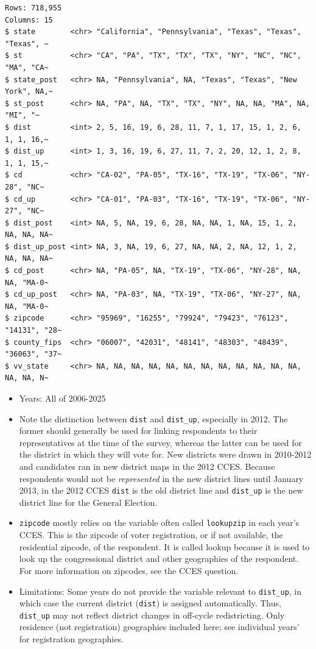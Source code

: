 \documentclass[10pt,article,oneside]{memoir}
\begin{document}
\begin{verbatim}
Rows: 718,955
Columns: 15
$ state        <chr> "California", "Pennsylvania", "Texas", "Texas", "Texas", ~
$ st           <chr> "CA", "PA", "TX", "TX", "TX", "NY", "NC", "NC", "MA", "CA~
$ state_post   <chr> NA, "Pennsylvania", NA, "Texas", "Texas", "New York", NA,~
$ st_post      <chr> NA, "PA", NA, "TX", "TX", "NY", NA, NA, "MA", NA, "MI", "~
$ dist         <int> 2, 5, 16, 19, 6, 28, 11, 7, 1, 17, 15, 1, 2, 6, 1, 1, 16,~
$ dist_up      <int> 1, 3, 16, 19, 6, 27, 11, 7, 2, 20, 12, 1, 2, 8, 1, 1, 15,~
$ cd           <chr> "CA-02", "PA-05", "TX-16", "TX-19", "TX-06", "NY-28", "NC~
$ cd_up        <chr> "CA-01", "PA-03", "TX-16", "TX-19", "TX-06", "NY-27", "NC~
$ dist_post    <int> NA, 5, NA, 19, 6, 28, NA, NA, 1, NA, 15, 1, 2, NA, NA, NA~
$ dist_up_post <int> NA, 3, NA, 19, 6, 27, NA, NA, 2, NA, 12, 1, 2, NA, NA, NA~
$ cd_post      <chr> NA, "PA-05", NA, "TX-19", "TX-06", "NY-28", NA, NA, "MA-0~
$ cd_up_post   <chr> NA, "PA-03", NA, "TX-19", "TX-06", "NY-27", NA, NA, "MA-0~
$ zipcode      <chr> "95969", "16255", "79924", "79423", "76123", "14131", "28~
$ county_fips  <chr> "06007", "42031", "48141", "48303", "48439", "36063", "37~
$ vv_state     <chr> NA, NA, NA, NA, NA, NA, NA, NA, NA, NA, NA, NA, NA, NA, N~
\end{verbatim}

\begin{itemize}
\tightlist
\item
  Years: All of 2006-2025
\item
  Note the distinction between \texttt{dist} and \texttt{dist\_up},
  especially in 2012. The former should generally be used for linking
  respondents to their representatives at the time of the survey,
  whereas the latter can be used for the district in which they will
  vote for. New districts were drawn in 2010-2012 and candidates ran in
  new district maps in the 2012 CCES. Because respondents would not be
  \emph{represented} in the new district lines until January 2013, in
  the 2012 CCES \texttt{dist} is the old district line and
  \texttt{dist\_up} is the new district line for the General Election.
\item
  \texttt{zipcode} mostly relies on the variable often called
  \texttt{lookupzip} in each year's CCES. This is the zipcode of voter
  registration, or if not available, the residential zipcode, of the
  respondent. It is called lookup because it is used to look up the
  congressional district and other geographies of the respondent. For
  more information on zipcodes, see the CCES question.
\item
  Limitations: Some years do not provide the variable relevant to
  \texttt{dist\_up}, in which case the current district (\texttt{dist})
  is assigned automatically. Thus, \texttt{dist\_up} may not reflect
  district changes in off-cycle redistricting. Only residence (not
  registration) geographies included here; see individual years' for
  registration geographies.
\end{itemize}
\end{document}
